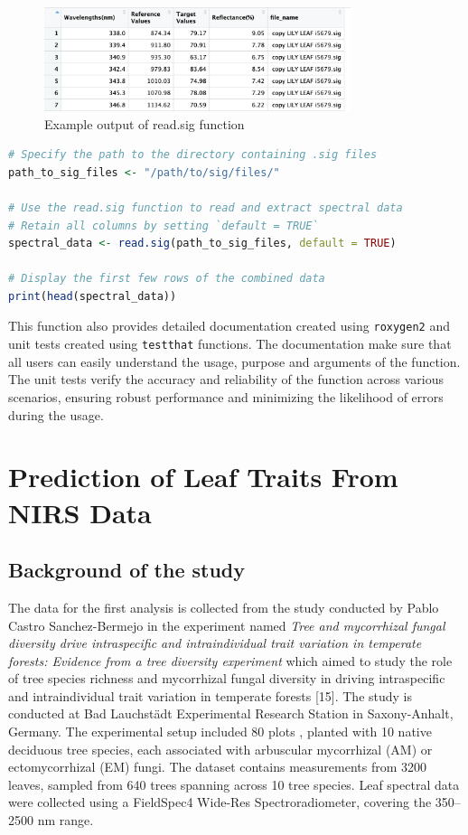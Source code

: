 \documentclass[12pt,a4paper]{report}
\begin{document}
\begin{figure}[h]
    \centering
    \includegraphics[width=0.8\textwidth]{Figures/read_sig.png}
    \caption{Example output of read.sig function}
    \label{fig:read_sig}
\end{figure}

\begin{lstlisting}[language=R, style=mystyle]
# Specify the path to the directory containing .sig files
path_to_sig_files <- "/path/to/sig/files/"

# Use the read.sig function to read and extract spectral data
# Retain all columns by setting `default = TRUE`
spectral_data <- read.sig(path_to_sig_files, default = TRUE)

# Display the first few rows of the combined data
print(head(spectral_data))
\end{lstlisting}

This function also provides detailed documentation created using \texttt{roxygen2} and unit tests created using \texttt{testthat} functions. The documentation make sure that all users can easily understand the  usage, purpose and arguments of the function. The unit tests verify the accuracy and reliability of the function across various scenarios, ensuring robust performance and minimizing the likelihood of errors during the usage.

\section{Prediction of Leaf Traits From NIRS Data} 
\subsection*{Background of the study}
The data for the first analysis is collected from the study conducted by Pablo Castro Sanchez-Bermejo in the experiment named \textit{Tree and mycorrhizal fungal diversity drive intraspecific and intraindividual trait variation in temperate forests: Evidence from a tree diversity experiment} which aimed to study the role of tree species richness and mycorrhizal fungal diversity in driving intraspecific and intraindividual trait variation in temperate forests [15]. The study is conducted at Bad Lauchstädt Experimental Research Station in Saxony-Anhalt, Germany. The experimental setup included 80 plots , planted with 10 native deciduous tree species, each associated with arbuscular mycorrhizal (AM) or ectomycorrhizal (EM) fungi. The dataset contains measurements from 3200 leaves, sampled from 640 trees spanning across 10 tree species. Leaf spectral data were collected using a FieldSpec4 Wide-Res Spectroradiometer, covering the 350–2500 nm range. \\
\end{document}

